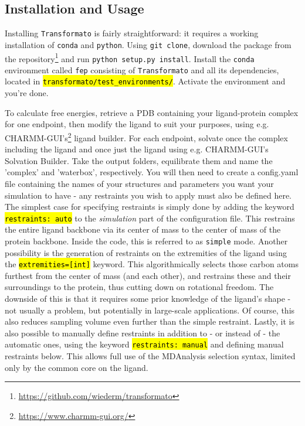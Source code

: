 \documentclass[oneside]{scrreprt}
\newcommand{\code}[1]{\texttt{\hl{#1}}}
\begin{document}
\subsection{Installation and Usage}\label{sec:installation}
Installing \texttt{Transformato} is fairly straightforward: it requires a working installation of \texttt{conda} and \texttt{python}. Using \texttt{git clone}, download the package from the repository\footnote{\url{https://github.com/wiederm/transformato}} and run \texttt{python setup.py install}. Install the \texttt{conda} environment called \texttt{fep} consisting of \texttt{Transformato} and all its dependencies, located in \code{transformato/test\_environments/}. Activate the environment and you're done.

To calculate free energies, retrieve a PDB containing your ligand-protein complex for one endpoint, then modify the ligand to suit your purposes, using e.g. CHARMM-GUI's\footnote{\url{https://www.charmm-gui.org/}} ligand builder. For each endpoint, solvate once the complex including the ligand and once just the ligand using e.g. CHARMM-GUI's Solvation Builder. Take the output folders, equilibrate them and name the 'complex' and 'waterbox', respectively. You will then need to create a config.yaml file containing the names of your structures and parameters you want your simulation to have - any restraints you wish to apply must also be defined here. The simplest case for specifying restraints is simply done by adding the keyword \code{restraints: auto} to the \emph{simulation} part of the configuration file. This restrains the entire ligand backbone via its center of mass to the center of mass of the protein backbone. Inside the code, this is referred to as \texttt{simple} mode. Another possibility is the generation of restraints on the extremities of the ligand using the \code{extremities=[int]} keyword. This algorithmically selects those carbon atoms furthest from the center of mass (and each other), and restrains these and their surroundings to the protein, thus cutting down on rotational freedom. The downside of this is that it requires some prior knowledge of the ligand's shape - not usually a problem, but potentially in large-scale applications. Of course, this also reduces sampling volume even further than the simple restraint. Lastly, it is also possible to manually define restraints in addition to - or instead of - the automatic ones, using the keyword \code{restraints: manual} and defining manual restraints below. This allows full use of the MDAnalysis\cite{agrawal2011,oliver_beckstein-proc-scipy-2016} selection syntax, limited only by the common core on the ligand.
\end{document}
